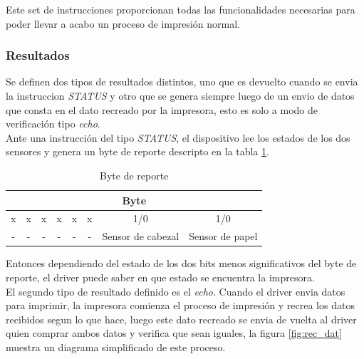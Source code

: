 Este set de instrucciones proporcionan todas las funcionalidades necesarias
para poder llevar a acabo un proceso de impresi\'on normal.

\subsubsection{Resultados}
%
Se definen dos tipos de resultados distintos, uno que es devuelto cuando se
envia la instruccion \emph{STATUS} y otro que se genera siempre luego de un
envio de datos que consta en el dato recreado por la impresora, esto es solo a
modo de verificaci\'on tipo \emph{echo}.\\

Ante una instrucci\'on del tipo \emph{STATUS}, el dispositivo lee los estados
de los dos sensores y genera un byte de reporte descripto en la tabla
\ref{tab:report_byte}.


\begin{table}[ht]
\centering
\begin{tabular}{|c|c|c|c|c|c|c|c|}									\hline
\multicolumn{8}{|c|}{Byte}										\\	\hline
x & x & x & x & x & x & 1/0 & 1/0 								\\ 	\hline
- & - & - & - & - & - & Sensor de cabezal & Sensor de papel		\\	\hline
\end{tabular}
\caption{Byte de reporte} 
\label{tab:report_byte}
\end{table}

Entonces dependiendo del estado de los dos bits menos significativos del byte
de reporte, el driver puede saber en que estado se encuentra la impresora.\\

El segundo tipo de resultado definido es el \emph{echo}. Cuando el driver
envia datos para imprimir, la impresora comienza el proceso de impresi\'on y
recrea los datos recibidos segun lo que hace, luego este dato recreado
se envia de vuelta al driver quien comprar ambos datos y verifica que sean
iguales, la figura \ref{fig:rec_dat} muestra un diagrama simplificado de este
proceso.

